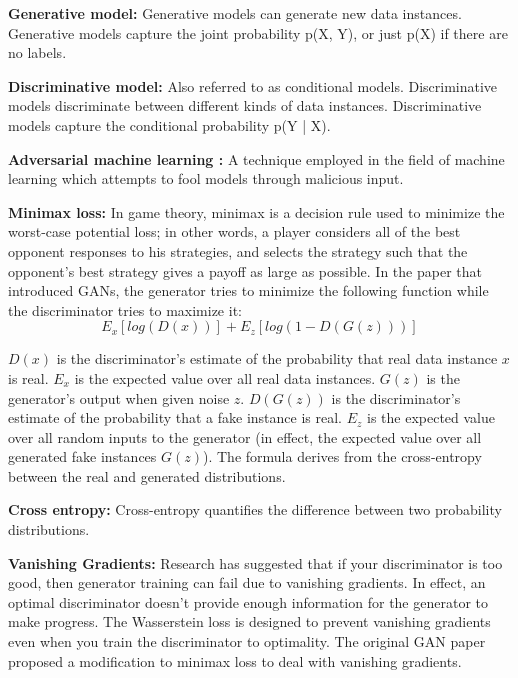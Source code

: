 \documentclass[11pt,letterpaper]{article}
\begin{document}
\textbf{Generative model:}
Generative models can generate new data instances. Generative models capture the joint probability p(X, Y), or just p(X) if there are no labels.

\textbf{Discriminative model:}
Also referred to as conditional models. Discriminative models discriminate between different kinds of data instances. Discriminative models capture the conditional probability p(Y | X).

\textbf{Adversarial machine learning :}
A technique employed in the field of machine learning which attempts to fool models through malicious input.

\textbf{Minimax loss:}
In game theory, minimax is a decision rule used to minimize the worst-case potential loss; in other words, a player considers all of the best opponent responses to his strategies, and selects the strategy such that the opponent's best strategy gives a payoff as large as possible. In the paper that introduced GANs, the generator tries to minimize the following function while the discriminator tries to maximize it:
\begin{equation}
    E_x[log(D(x))] + E_z[log(1-D(G(z)))]
\end{equation}

$D(x)$ is the discriminator's estimate of the probability that real data instance $x$ is real. $E_x$ is the expected value over all real data instances. $G(z)$ is the generator's output when given noise $z$. $D(G(z))$ is the discriminator's estimate of the probability that a fake instance is real. $E_z$ is the expected value over all random inputs to the generator (in effect, the expected value over all generated fake instances $G(z)$). The formula derives from the cross-entropy between the real and generated distributions.

\textbf{Cross entropy:}
Cross-entropy quantifies the difference between two probability distributions.

\textbf{Vanishing Gradients:}
Research has suggested that if your discriminator is too good, then generator training can fail due to vanishing gradients. In effect, an optimal discriminator doesn't provide enough information for the generator to make progress. The Wasserstein loss is designed to prevent vanishing gradients even when you train the discriminator to optimality. The original GAN paper proposed a modification to minimax loss to deal with vanishing gradients.
\end{document}

